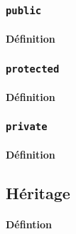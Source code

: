 \documentclass{article}
\begin{document}
\subsubsection{\texttt{public}}
\paragraph{Définition}

\subsubsection{\texttt{protected}}
\paragraph{Définition}

\subsubsection{\texttt{private}}
\paragraph{Définition}

\subsection{Héritage}
\paragraph{Défintion}
\end{document}
